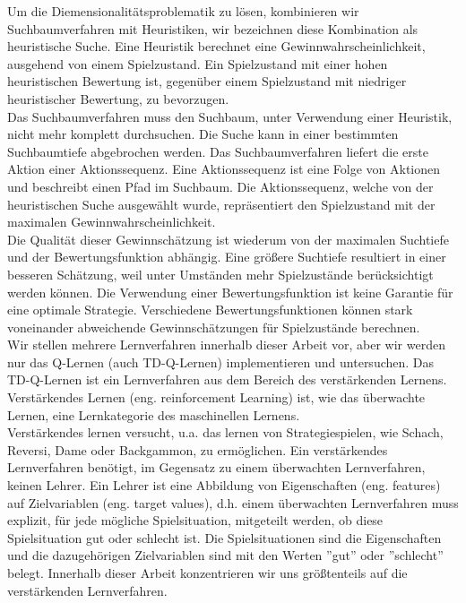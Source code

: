 Um die Diemensionalitätsproblematik zu lösen, kombinieren wir Suchbaumverfahren mit Heuristiken, wir bezeichnen diese Kombination als heuristische Suche. Eine Heuristik berechnet eine Gewinnwahrscheinlichkeit, ausgehend von einem Spielzustand. Ein Spielzustand mit einer hohen heuristischen Bewertung ist, gegenüber einem Spielzustand mit niedriger heuristischer Bewertung, zu bevorzugen. \\

Das Suchbaumverfahren muss den Suchbaum, unter Verwendung einer Heuristik, nicht mehr komplett durchsuchen. Die Suche kann in einer bestimmten Suchbaumtiefe abgebrochen werden. Das Suchbaumverfahren liefert die erste Aktion einer Aktionssequenz. Eine Aktionssequenz ist eine Folge von Aktionen und beschreibt einen Pfad im Suchbaum. Die Aktionssequenz, welche von der heuristischen Suche ausgewählt wurde, repräsentiert den Spielzustand mit der maximalen Gewinnwahrscheinlichkeit. \\

Die Qualität dieser Gewinnschätzung ist wiederum von der maximalen Suchtiefe und der Bewertungsfunktion abhängig. Eine größere Suchtiefe resultiert in einer besseren Schätzung, weil unter Umständen mehr Spielzustände berücksichtigt werden können. Die Verwendung einer Bewertungsfunktion ist keine Garantie für eine optimale Strategie. Verschiedene Bewertungsfunktionen können stark voneinander abweichende Gewinnschätzungen für Spielzustände berechnen. \\

Wir stellen mehrere Lernverfahren innerhalb dieser Arbeit vor, aber wir werden nur das Q-Lernen (auch TD-Q-Lernen) implementieren und untersuchen. Das TD-Q-Lernen ist ein Lernverfahren aus dem Bereich des verstärkenden Lernens. Verstärkendes Lernen (eng. reinforcement Learning) ist, wie das überwachte Lernen, eine Lernkategorie des maschinellen Lernens. \\

Verstärkendes lernen versucht, u.a. das lernen von Strategiespielen, wie Schach, Reversi, Dame oder Backgammon, zu ermöglichen. Ein verstärkendes Lernverfahren benötigt, im Gegensatz zu einem überwachten Lernverfahren, keinen Lehrer. Ein Lehrer ist eine Abbildung von Eigenschaften (eng. features) auf Zielvariablen (eng. target values), d.h. einem überwachten Lernverfahren muss explizit, für jede mögliche Spielsituation, mitgeteilt werden,  ob diese Spielsituation gut oder schlecht ist. Die Spielsituationen sind die Eigenschaften und die dazugehörigen Zielvariablen sind mit den Werten ''gut'' oder ''schlecht'' belegt. Innerhalb dieser Arbeit konzentrieren wir uns größtenteils auf die verstärkenden Lernverfahren. \\

